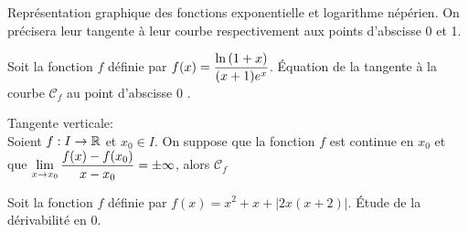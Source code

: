 \documentclass[a4paper, 11pt]{article}
\begin{document}
\begin{exemples} Repr\'esentation graphique des fonctions exponentielle et logarithme n\'ep\'erien. On pr\'ecisera leur tangente \`{a} leur courbe respectivement aux points d'abscisse 0 et 1.\vsec
\end{exemples}



{\footnotesize \begin{exercice} Soit la fonction $f$ d\'efinie par $f(x)=\displaystyle\frac{\ln{(1+x)}}{(x+1)e^x}$. \'Equation de la tangente \`{a} la courbe $\mathcal{C}_f$ au point d'abscisse 0 .
\end{exercice}}

\vsec\vsec




{\noindent

	\begin{defi} Tangente verticale:\\
		\noindent Soient $f: I\rightarrow \mathbb{R}$ et $x_0\in I$. On suppose que la fonction $f$ est continue en $x_0$ et que $\lim\limits_{x\to x_0} \displaystyle\frac{f(x)-f(x_0)}{x-x_0}=\pm\infty$, \vsec alors $\mathcal{C}_f$ \dotfill\vsec
	\end{defi}
}

%
%
%
%
%
%
%


{\footnotesize \begin{exercice} Soit la fonction $f$ d\'efinie par $f(x)=x^2+x+|2x(x+2)|$. \'Etude de la d\'erivabilit\'e en 0.
	\end{exercice}}
\end{document}
